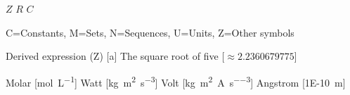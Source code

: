 
\DeclareMathOperator{\indicator} {1}
\DeclareMathOperator{\mean} {mean}
\DeclareMathOperator{\std} {std}


\DeclareMathOperator{\sgn}{sgn}


\NewDocumentCommand \Z {} { \ensuremath{Z} }
\NewDocumentCommand \R {} { \ensuremath{R} }
\NewDocumentCommand \C {} { \ensuremath{C} }


\DeclareSIQualifier{}  %
\DeclareSIQualifier{}
\DeclareSIUnit{}
\DeclareSIUnit{}
\DeclareSIUnit{}
\DeclareSIUnit\angstrom{\AA}



\SetNomGroups
{
    C=Constants,
    M=Sets,
    N=Sequences,
    U=Units,
    Z=Other symbols
}



     {Derived expression}
\NomMath (Z) [a] {} {The square root of five} [$\approx 2.2360679775$]

 {Molar} [\unit{\mol\per\liter}]
 {Watt} [\unit{\kilogram \meter \squared \per \second \cubed}]
 {Volt} [\unit{\kilogram \meter \squared \per \ampere \per \second \cubed}]
\NomUnit {\AA} {Angstrom} [\qty{1E-10}{\meter}]

